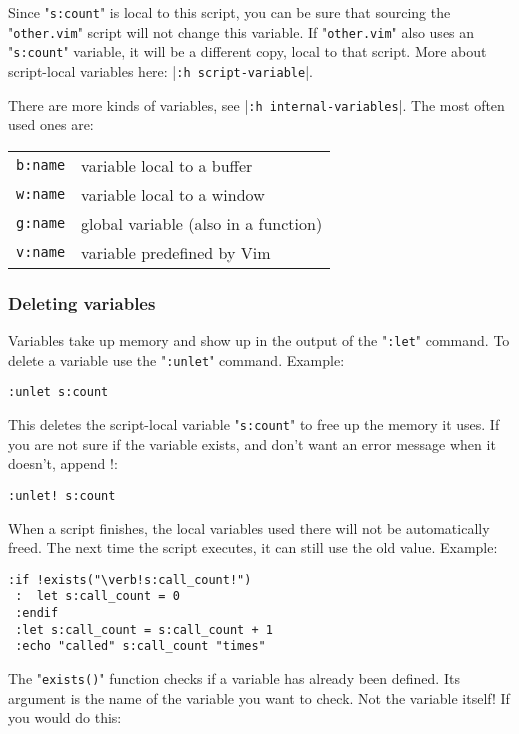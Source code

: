 Since "\verb!s:count!" is local to this script, you can be sure that sourcing the "\verb!other.vim!" script will not change this variable.
If "\verb!other.vim!" also uses an "\verb!s:count!" variable, it will be a different copy, local to that script.
More about script-local variables here: |\verb!:h script-variable!|.

There are more kinds of variables, see |\verb!:h internal-variables!|.
The most often used ones are:

\begin{center} \begin{tabular}{l l}
				\verb!b:name! & variable local to a buffer \\
				\verb!w:name! & variable local to a window \\
				\verb!g:name! & global variable (also in a function) \\
				\verb!v:name! & variable predefined by Vim \\
\end{tabular} \end{center}
\subsubsection{Deleting variables}
Variables take up memory and show up in the output of the "\verb!:let!" command.
To delete a variable use the "\verb!:unlet!" command.
Example:

\begin{Verbatim}[samepage=true]
 :unlet s:count
\end{Verbatim}

This deletes the script-local variable "\verb!s:count!" to free up the memory it uses.
If you are not sure if the variable exists, and don't want an error message when it doesn't, append !:

\begin{Verbatim}[samepage=true]
 :unlet! s:count
\end{Verbatim}

When a script finishes, the local variables used there will not be automatically freed.
The next time the script executes, it can still use the old value.
Example:

\begin{Verbatim}[samepage=true]
 :if !exists("\verb!s:call_count!")
 :  let s:call_count = 0
 :endif
 :let s:call_count = s:call_count + 1
 :echo "called" s:call_count "times"
\end{Verbatim}

The "\verb!exists()!" function checks if a variable has already been defined.
Its argument is the name of the variable you want to check.
Not the variable itself!  If you would do this:

